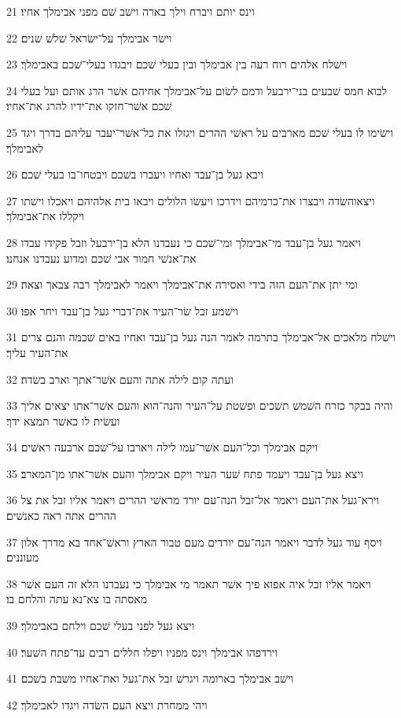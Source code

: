 \par 21 וינס יותם ויברח וילך בארה וישׁב שׁם מפני אבימלך אחיו׃
\par 22 וישׂר אבימלך על־ישׂראל שׁלשׁ שׁנים׃
\par 23 וישׁלח אלהים רוח רעה בין אבימלך ובין בעלי שׁכם ויבגדו בעלי־שׁכם באבימלך׃
\par 24 לבוא חמס שׁבעים בני־ירבעל ודמם לשׂום על־אבימלך אחיהם אשׁר הרג אותם ועל בעלי שׁכם אשׁר־חזקו את־ידיו להרג את־אחיו׃
\par 25 וישׂימו לו בעלי שׁכם מארבים על ראשׁי ההרים ויגזלו את כל־אשׁר־יעבר עליהם בדרך ויגד לאבימלך׃
\par 26 ויבא געל בן־עבד ואחיו ויעברו בשׁכם ויבטחו־בו בעלי שׁכם׃
\par 27 ויצאוהשׂדה ויבצרו את־כרמיהם וידרכו ויעשׂו הלולים ויבאו בית אלהיהם ויאכלו וישׁתו ויקללו את־אבימלך׃
\par 28 ויאמר געל בן־עבד מי־אבימלך ומי־שׁכם כי נעבדנו הלא בן־ירבעל וזבל פקידו עבדו את־אנשׁי חמור אבי שׁכם ומדוע נעבדנו אנחנו׃
\par 29 ומי יתן את־העם הזה בידי ואסירה את־אבימלך ויאמר לאבימלך רבה צבאך וצאה׃
\par 30 וישׁמע זבל שׂר־העיר את־דברי געל בן־עבד ויחר אפו׃
\par 31 וישׁלח מלאכים אל־אבימלך בתרמה לאמר הנה געל בן־עבד ואחיו באים שׁכמה והנם צרים את־העיר עליך׃
\par 32 ועתה קום לילה אתה והעם אשׁר־אתך וארב בשׂדה׃
\par 33 והיה בבקר כזרח השׁמשׁ תשׁכים ופשׁטת על־העיר והנה־הוא והעם אשׁר־אתו יצאים אליך ועשׂית לו כאשׁר תמצא ידך׃
\par 34 ויקם אבימלך וכל־העם אשׁר־עמו לילה ויארבו על־שׁכם ארבעה ראשׁים׃
\par 35 ויצא געל בן־עבד ויעמד פתח שׁער העיר ויקם אבימלך והעם אשׁר־אתו מן־המארב׃
\par 36 וירא־געל את־העם ויאמר אל־זבל הנה־עם יורד מראשׁי ההרים ויאמר אליו זבל את צל ההרים אתה ראה כאנשׁים׃
\par 37 ויסף עוד געל לדבר ויאמר הנה־עם יורדים מעם טבור הארץ וראשׁ־אחד בא מדרך אלון מעוננים׃
\par 38 ויאמר אליו זבל איה אפוא פיך אשׁר תאמר מי אבימלך כי נעבדנו הלא זה העם אשׁר מאסתה בו צא־נא עתה והלחם בו׃
\par 39 ויצא געל לפני בעלי שׁכם וילחם באבימלך׃
\par 40 וירדפהו אבימלך וינס מפניו ויפלו חללים רבים עד־פתח השׁער׃
\par 41 וישׁב אבימלך בארומה ויגרשׁ זבל את־געל ואת־אחיו משׁבת בשׁכם׃
\par 42 ויהי ממחרת ויצא העם השׂדה ויגדו לאבימלך׃
